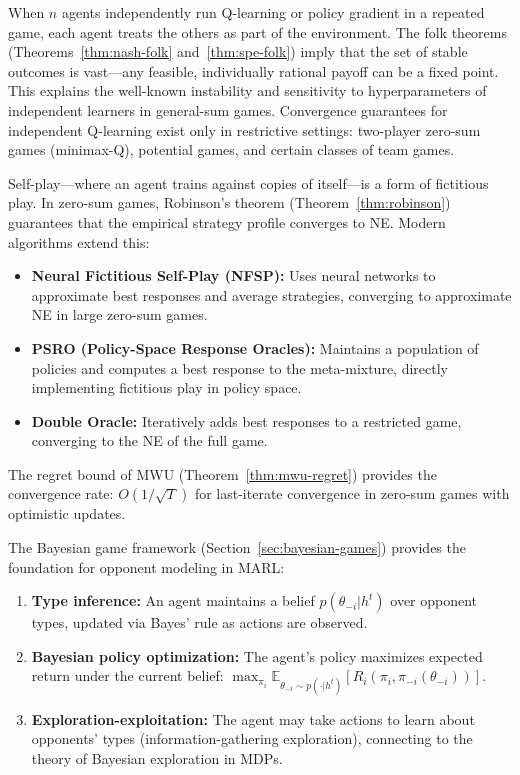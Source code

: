 \documentclass[11pt,a4paper]{article}
\theoremstyle{definition}
\theoremstyle{plain}
\theoremstyle{remark}
\newcommand{\E}{\mathbb{E}}
\begin{document}
\begin{rlconnection}
When $n$ agents independently run Q-learning or policy gradient in a repeated game, each
agent treats the others as part of the environment. The folk theorems
(Theorems~\ref{thm:nash-folk} and~\ref{thm:spe-folk}) imply that the set of stable
outcomes is vast---any feasible, individually rational payoff can be a fixed point. This
explains the well-known instability and sensitivity to hyperparameters of independent
learners in general-sum games. Convergence guarantees for independent Q-learning exist
only in restrictive settings: two-player zero-sum games (minimax-Q), potential games, and
certain classes of team games.
\end{rlconnection}

\begin{rlconnection}
Self-play---where an agent trains against copies of itself---is a form of fictitious play.
In zero-sum games, Robinson's theorem (Theorem~\ref{thm:robinson}) guarantees that the
empirical strategy profile converges to NE. Modern algorithms extend this:
\begin{itemize}
    \item \textbf{Neural Fictitious Self-Play (NFSP):} Uses neural networks to approximate
    best responses and average strategies, converging to approximate NE in large zero-sum
    games.
    \item \textbf{PSRO (Policy-Space Response Oracles):} Maintains a population of
    policies and computes a best response to the meta-mixture, directly implementing
    fictitious play in policy space.
    \item \textbf{Double Oracle:} Iteratively adds best responses to a restricted game,
    converging to the NE of the full game.
\end{itemize}
The regret bound of MWU (Theorem~\ref{thm:mwu-regret}) provides the convergence rate:
$O(1/\sqrt{T})$ for last-iterate convergence in zero-sum games with optimistic updates.
\end{rlconnection}

\begin{rlconnection}
The Bayesian game framework (Section~\ref{sec:bayesian-games}) provides the foundation for
opponent modeling in MARL:
\begin{enumerate}[label=(\roman*)]
    \item \textbf{Type inference:} An agent maintains a belief $p(\theta_{-i} | h^t)$ over
    opponent types, updated via Bayes' rule as actions are observed.
    \item \textbf{Bayesian policy optimization:} The agent's policy maximizes expected
    return under the current belief: $\max_{\pi_i} \E_{\theta_{-i} \sim p(\cdot | h^t)}
    [R_i(\pi_i, \pi_{-i}(\theta_{-i}))]$.
    \item \textbf{Exploration-exploitation:} The agent may take actions to learn about
    opponents' types (information-gathering exploration), connecting to the theory of
    Bayesian exploration in MDPs.
\end{enumerate}
\end{rlconnection}
\end{document}
